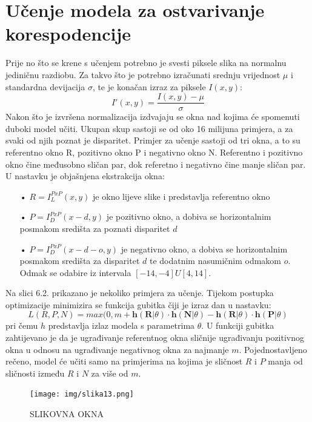 \documentclass[times, utf8, zavrsni, numeric]{fer}
\begin{document}
\section{Učenje modela za ostvarivanje korespodencije}
Prije no što se krene s učenjem potrebno je svesti piksele slika na normalnu jediničnu razdiobu. Za takvo što je potrebno izračunati srednju vrijednost $\mu$ i standardna devijacija $\sigma$, te je konačan izraz za piksele $I(x,y)$:
\begin{equation}
I'(x,y)= \frac{I(x,y) - \mu}{\sigma}
\label{eq:normalizacija}
\end{equation}
Nakon što je izvršena normalizacija izdvajaju se okna nad kojima će spomenuti duboki model učiti.
Ukupan skup sastoji se od oko 16 milijuna primjera, a za svaki od njih poznat je disparitet.
Primjer za učenje sastoji od tri okna, a to su referentno okno R, pozitivno okno P i negativno okno N. Referentno i pozitivno okno čine međusobno sličan par, dok referetno i negativno čine manje sličan par. U nastavku je objašnjena ekstrakcija okna:
\begin{itemize}
\item[•] $R = I_{L}^{PxP}(x,y)$ je okno lijeve slike i predstavlja referentno okno
\item[•] $P = I_{D}^{PxP}(x-d,y)$ je pozitivno okno, a dobiva se horizontalnim posmakom središta za poznati disparitet $d$
\item[•] $P = I_{D}^{PxP}(x-d-o,y)$ je negativno okno, a dobiva se horizontalnim posmakom središta  za disparitet $d$ te dodatnim nasumičnim odmakom $o$. Odmak se odabire iz intervala $[-14, -4] U [4, 14]$.
\end{itemize}
Na slici 6.2. prikazano je nekoliko primjera za učenje.
Tijekom postupka optimizacije minimizira se funkcija gubitka čiji je izraz dan u nastavku:
\begin{equation}
L(R, P, N) = max(0, m + \textbf{h}(\textbf{R}|\theta)\cdot \textbf{h}(\textbf{N}|\theta)-\textbf{h}(\textbf{R}|\theta)\cdot \textbf{h}(\textbf{P}|\theta)
\label{eq:gubitak}
\end{equation}
pri čemu $h$ predstavlja izlaz modela s parametrima $\theta$. U funkciji gubitka zahtijevano je da je ugrađivanje referentnog okna sličnije ugrađivanju pozitivnog okna u odnosu na ugrađivanje negativnog okna za najmanje $m$. Pojednostavljeno rečeno, model će učiti samo na primjerima na kojima je sličnost $R$ i $P$ manja od sličnosti između $R$ i $N$ za više od $m$.\cite{orsic}
\begin{figure}[htb]
\centering
\texttt{[image: img/slika13.png]}
\caption{SLIKOVNA OKNA}
\label{fig:KITTI}
\end{figure}
\end{document}
